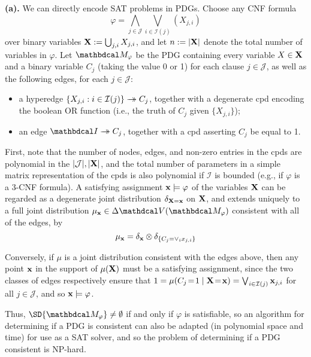 \begin{lproof} \label{proof:consistent-NP-hard}
    \textbf{(a).}
	We can directly encode SAT problems in PDGs.
	Choose any CNF formula
	$$\varphi = \bigwedge_{j \in \mathcal J} \bigvee_{i \in \mathcal I(j)} (X_{j,i})$$
	over binary variables $\mathbf X := \bigcup_{j,i} X_{j,i}$,
    and let $n := |\mathbf X|$ denote the total number of variables in $\varphi$.
    Let
	$\dg M_\varphi$ be the PDG containing every variable $X \in \mathbf X$ and a binary
	variable $C_j$ (taking the value 0 or 1) for each clause $j \in \mathcal J$, as well as the following edges, for each $j \in \mathcal J$:
	\begin{itemize}
		\item a hyperedge $\{X_{j,i} : i \in \mathcal I(j)\} \rightarrow\mathrel{\mspace{-15mu}}\rightarrow C_j$, together with a degenerate cpd
			encoding the boolean OR function (i.e., the truth of $C_j$ given $\{X_{j,i}\}$);
		\item an edge $\pdgunit \tto C_j$, together with a cpd asserting $C_j$ be equal to 1.
	\end{itemize}
	First, note that the number of nodes, edges, and non-zero entries in the cpds are polynomial in the $|\mathcal J|, |\mathbf X|$, and the total number of parameters in a simple matrix representation of the cpds is also polynomial if $\mathcal I$ is bounded (e.g., if $\varphi$ is a 3-CNF formula).
	A satisfying assignment $\mathbf x \models \varphi$ of the variables $\mathbf X$ can be regarded as a degenerate joint distribution $\delta_{\mathbf X = \mathbf x}$ on $\mathbf X$, and extends uniquely to a full joint distribution $\mu_{\mat x} \in \Delta \V(\dg M_\varphi)$ consistent with all of the edges, by
	\[ \mu_{\mathbf x} = \delta_{\mathbf x} \otimes \delta_{\{C_j = \vee_i  x_{j,i}\}} \]

 	Conversely, if $\mu$ is a joint distribution consistent with the edges above, then any point $\mathbf x$ in the support of $\mu(\mathbf X)$ must be a satisfying assignment, since the two classes of edges respectively ensure that $1 =\mu(C_j\!=\! 1 \mid \mathbf X \!=\! \mathbf x) = \bigvee_{i \in \mathcal I(j)} \mathbf x_{j,i}$ for all $j \in \mathcal J$, and so $\mathbf x \models \varphi$.

	Thus, $\SD{\dg M_\varphi} \ne \emptyset$ if and only if $\varphi$ is satisfiable, so
	an algorithm for determining if a PDG is consistent can also be adapted (in polynomial space and time) for use as a SAT solver, and so the problem of determining if a PDG consistent is NP-hard.




\end{lproof}
